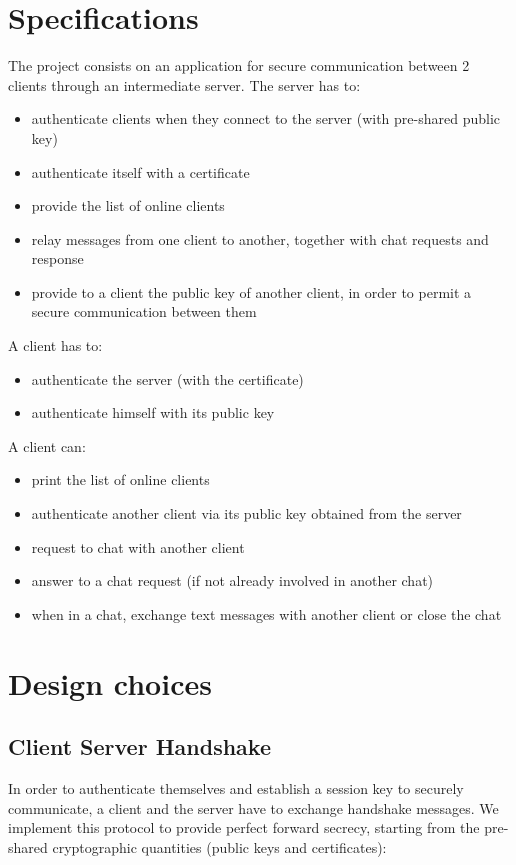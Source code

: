 \documentclass[11pt]{report}
\begin{document}
\chapter{Specifications}
	\noindent The project consists on an application for secure communication between 2 clients through an intermediate server.
	\newline
	The server has to:
	\begin{itemize}
		\item authenticate clients when they connect to the server (with pre-shared public key)
		\item authenticate itself with a certificate
		\item provide the list of online clients
		\item relay messages from one client to another, together with chat requests and response
		\item provide to a client the public key of another client, in order to permit a secure communication between them
	\end{itemize}
	A client has to:
	\begin{itemize}
		\item authenticate the server (with the certificate)
		\item authenticate himself with its public key
	\end{itemize}
	A client can:
	\begin{itemize}
		\item print the list of online clients
		\item authenticate another client via its public key obtained from the server
		\item request to chat with another client
		\item answer to a chat request (if not already involved in another chat)
		\item when in a chat, exchange text messages with another client or close the chat
	\end{itemize}

\newpage
\chapter{Design choices}
\section{Client Server Handshake}
In order to authenticate themselves and establish a session key to securely communicate, a client
and the server have to exchange handshake messages. We implement this protocol to provide perfect 
forward secrecy, starting from the pre-shared cryptographic quantities (public keys and certificates):
\end{document}
